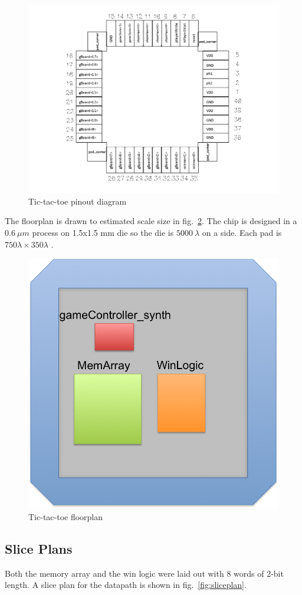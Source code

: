 \documentclass[]{article}
\begin{document}
\begin{figure}
\centering
\includegraphics[width=.8\textwidth]{pinout}
\caption{Tic-tac-toe pinout diagram}
\label{fig:pinout}
\end{figure}

The floorplan is drawn to estimated scale size in fig.~\ref{fig:floorplan}. The chip is designed in a $0.6~\mu m$ process on 1.5x1.5 mm die so the die is $5000~\lambda$
on a side. Each pad is $750 \lambda \times 350 \lambda$
\cite{e85-book}.


\begin{figure}
\centering
\includegraphics[width=.6\textwidth]{chipsize}
\caption{Tic-tac-toe floorplan}
\label{fig:floorplan}
\end{figure}

\subsection{Slice Plans}
Both the memory array and the win logic were laid out with 8 words of 2-bit length. A slice plan for the datapath is shown in fig.~\ref{fig:sliceplan}.
\end{document}
